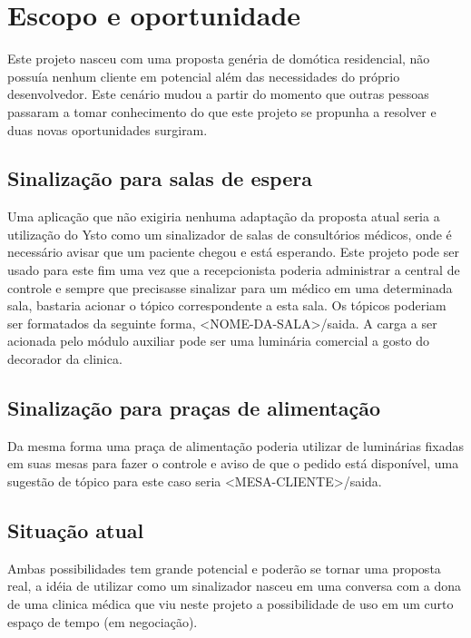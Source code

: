 \section{Escopo e oportunidade}
Este projeto nasceu com uma proposta genéria de domótica residencial, não possuía nenhum cliente em potencial além das necessidades do próprio desenvolvedor. Este cenário mudou a partir do momento que outras pessoas passaram a tomar conhecimento do que este projeto se propunha a resolver e duas novas oportunidades surgiram.

\subsection{Sinalização para salas de espera}
Uma aplicação que não exigiria nenhuma adaptação da proposta atual seria a utilização do Ysto como um sinalizador de salas de consultórios médicos, onde é necessário avisar que um paciente chegou e está esperando. Este projeto pode ser usado para este fim uma vez que a recepcionista poderia administrar a central de controle e sempre que precisasse sinalizar para um médico em uma determinada sala, bastaria acionar o tópico correspondente a esta sala. Os tópicos poderiam ser formatados da seguinte forma, <NOME-DA-SALA>/saida. A carga a ser acionada pelo módulo auxiliar pode ser uma luminária comercial a gosto do decorador da clinica.

\subsection{Sinalização para praças de alimentação}
Da mesma forma uma praça de alimentação poderia utilizar de luminárias fixadas em suas mesas para fazer o controle e aviso de que o pedido está disponível, uma sugestão de tópico para este caso seria <MESA-CLIENTE>/saida.

\subsection{Situação atual}
Ambas possibilidades tem grande potencial e poderão se tornar uma proposta real, a idéia de utilizar como um sinalizador nasceu em uma conversa com a dona de uma clinica médica que viu neste projeto a possibilidade de uso em um curto espaço de tempo (em negociação).
